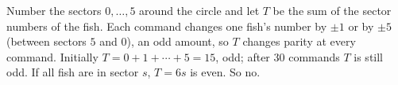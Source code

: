 Number the sectors $0,\dots,5$ around the circle and let $T$ be the sum of the sector numbers of the fish. Each command changes one fish's number by $\pm1$ or by $\pm5$ (between sectors $5$ and $0$), an odd amount, so $T$ changes parity at every command. Initially $T=0+1+\cdots+5=15$, odd; after $30$ commands $T$ is still odd. If all fish are in sector $s$, $T=6s$ is even. So $\boxed{\text{no}}$.

